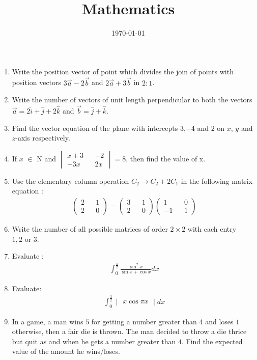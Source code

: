 \documentclass[12pt,-letter paper]{article}
\title{Mathematics}
\date{\today}
\theoremstyle{remark}
\newcommand{\myvec}[1]{\ensuremath{\begin{pmatrix}#1\end{pmatrix}}}
\newcommand{\mydet}[1]{\ensuremath{\begin{vmatrix}#1\end{vmatrix}}}
\begin{document}

\begin{enumerate}
    \item Write the position vector of point which divides the join of points with position vectors  ${3\overrightarrow{a}-2\overrightarrow{b}}$ and ${2\overrightarrow{a}+3\overrightarrow{b}}$ in $2:1$.
    \item Write the number of vectors of unit length perpendicular to both the vectors $\overrightarrow{a} = 2\hat{i} + \hat{j}+2\hat{k}$ and $\overrightarrow{b}=\hat{j}+\hat{k}$.
    \item Find the vector equation of the plane with intercepts $3$,$-$4 and $2$ on $x$, $y$ and $z$-axis respectively.
    \item If $x$ $\in $ N and $\mydet{x+3 && -2 \\ -3x && 2x} = 8$, then find the value of x.
    \item Use the elementary column operation $C_2 \rightarrow C_2 + 2C_1$ in the following matrix equation : 
    \begin{align*}
        \myvec{2 && 1 \\2&& 0} = \myvec{3 && 1 \\ 2 && 0} \myvec{1 && 0 \\-1 && 1}
    \end{align*}
    \item Write the number of all possible matrices of order $2\times2$  with each entry $1,2 \text{ or } 3$.


    \item Evaluate :
    \begin{align*}
        \int_{0}^\frac{\pi}{2}{\frac{\sin^2x}{\sin x+ \cos x}}{dx}
    \end{align*}
    \item Evaluate:
    \begin{align*}
        \int_{0}^\frac{3}{2}{\mydet{x \cos \pi x}}dx
    \end{align*}
    \item In a game, a man wins \rupee $5$ for getting a number greater than 4 and loses \rupee $1$ otherwise, then a fair die is thrown. The man decided to throw a die thrice but  quit as and when he gets a number greater than $4$. Find the expected value of the amount he wins/loses.
    

\end{enumerate}
\end{document}

